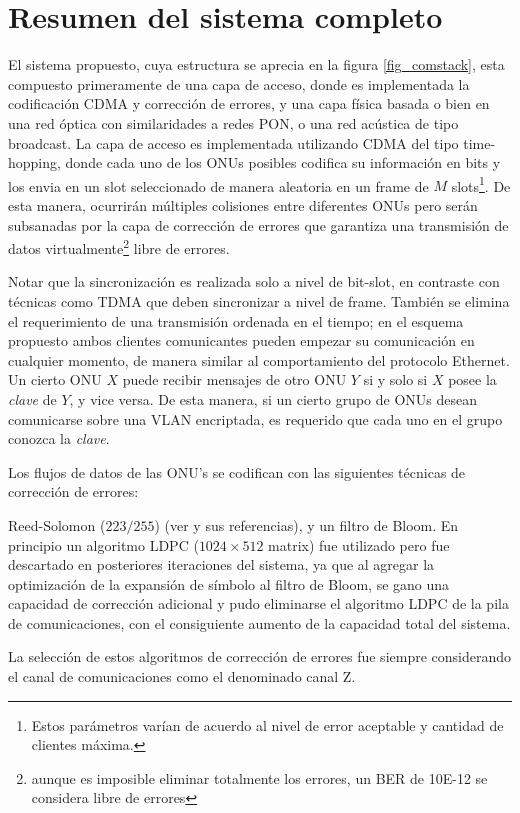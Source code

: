 \section{Resumen del sistema completo}
El sistema propuesto, cuya estructura se aprecia en la figura \ref{fig_comstack}, esta compuesto primeramente de una capa de acceso, donde es implementada la codificación CDMA y corrección de errores, y una capa física basada o bien en una red óptica con similaridades a redes PON, o una red acústica de tipo broadcast.
La capa de acceso es implementada utilizando CDMA del tipo time-hopping, donde cada uno de los ONUs posibles codifica su información en bits y los envia en un slot seleccionado de manera aleatoria en un frame de $M$ slots\footnote{ Estos parámetros varían de acuerdo al nivel de error aceptable y cantidad de clientes máxima.}. De esta manera, ocurrirán múltiples colisiones entre diferentes ONUs pero serán subsanadas por la capa de corrección de errores que garantiza una transmisión de datos virtualmente\footnote{aunque es imposible eliminar totalmente los errores, un BER de 10E-12 se considera libre de errores} libre de errores.

Notar que la sincronización es realizada solo a nivel de bit-slot, en contraste con técnicas como TDMA que deben sincronizar a nivel de frame. También se elimina el requerimiento de una transmisión ordenada en el tiempo; en el esquema propuesto ambos clientes comunicantes pueden empezar su comunicación en cualquier momento, de manera similar al comportamiento del protocolo Ethernet.
Un cierto ONU $X$ puede recibir mensajes de otro ONU $Y$ si y solo si $X$ posee la {\em clave} de $Y$, y vice versa. De esta manera, si un cierto grupo de ONUs desean comunicarse sobre una VLAN encriptada, es requerido que cada uno en el grupo conozca la {\em clave}.

Los flujos de datos de las ONU's se codifican con las siguientes técnicas de corrección de errores:

Reed-Solomon ($223/255$) (ver \cite{Moon:05} y sus referencias), y un filtro de Bloom\cite{Bloom70space/timetrade-offs}. En principio un algoritmo LDPC ($1024\times512$ matrix) fue utilizado pero fue descartado en posteriores iteraciones del sistema, ya que al agregar la optimización de la expansión de símbolo al filtro de Bloom, se gano una capacidad de corrección adicional y pudo eliminarse el algoritmo LDPC de la pila de comunicaciones, con el consiguiente aumento de la capacidad total del sistema.

La selección de estos algoritmos de corrección de errores fue siempre considerando el canal de comunicaciones como el denominado canal Z. %

